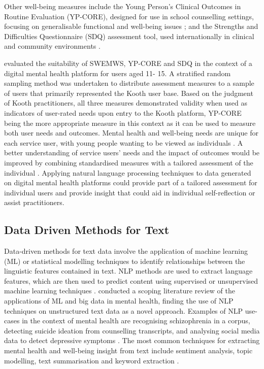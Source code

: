 \documentclass[12pt]{article}
\begin{document}
Other well-being measures include the Young Person’s Clinical Outcomes in Routine Evaluation (YP-CORE), designed for use in school counselling settings, focusing on generalisable functional and well-being issues \parencite{twigg_young_2009}; and the Strengths and Difficulties Questionnaire (SDQ) assessment tool, used internationally in clinical and community environments \parencite{goodman_strengths_1997}.

\textcite{mindel_assessing_2021} evaluated the suitability of SWEMWS, YP-CORE and SDQ in the context of a digital mental health platform for users aged 11- 15. A stratified random sampling method was undertaken to distribute assessment measures to a sample of users that primarily represented the Kooth user base. Based on the judgment of Kooth practitioners, all three measures demonstrated validity when used as indicators of user-rated needs upon entry to the Kooth platform, YP-CORE being the more appropriate measure in this context as it can be used to measure both user needs and outcomes. Mental health and well-being needs are unique for each service user, with young people wanting to be viewed as individuals \parencite{jacob_measuring_2017, sefi_testing_2021}. A better understanding of service users’ needs and the impact of outcomes would be improved by combining standardised measures with a tailored assessment of the individual \parencite{mindel_assessing_2021}. Applying natural language processing techniques to data generated on digital mental health platforms could provide part of a tailored assessment for individual users and provide insight that could aid in individual self-reflection or assist practitioners. 
\subsection{Data Driven Methods for Text}
Data-driven methods for text data involve the application of machine learning (ML) or statistical modelling techniques to identify relationships between the linguistic features contained in text. NLP methods are used to extract language features, which are then used to predict content using supervised or unsupervised machine learning techniques \parencite{jaidka_estimating_2020}. 
\textcite{shatte_machine_2018} conducted a scoping literature review of the applications of ML and big data in mental health, finding the use of NLP techniques on unstructured text data as a novel approach. Examples of NLP use-cases in the context of mental health are recognising schizophrenia in a corpus, detecting suicide ideation from counselling transcripts, and analysing social media data to detect depressive symptoms \parencite{strous_automated_2009, oseguera_automatic_2017, coppersmith_natural_2018}. The most common techniques for extracting mental health and well-being insight from text include sentiment analysis, topic modelling, text summarisation and keyword extraction \parencite{shatte_machine_2018}. 
\end{document}
